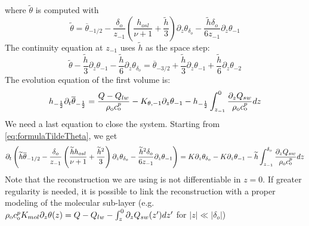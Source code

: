 where $\widetilde{\theta}$ is computed with
\begin{equation}
\label{eq:formulaTildeTheta}
\widetilde{\theta} = \overline{\theta}_{-1/2}
	-\frac{\delta_o}{z_{-1}}\left(
\frac{h_{osl}}{\nu+1} + \frac{\widetilde{h}}{3}
\right)\partial_z \theta_{\delta_o}
	- \frac{\widetilde{h}\delta_o}{6z_{-1}}
\partial_z \theta_{-1}
\end{equation}
The continuity equation at $z_{-1}$
uses $\widetilde{h}$
as the space step:
\begin{equation}
    \widetilde{\theta}
    - \frac{\widetilde{h}}{3}
    \partial_z \theta_{-1}
    - \frac{\widetilde{h}}{6}
    \partial_z \theta_{\delta_o}
    = \overline{\theta}_{-3/2}
    + \frac{\widetilde{h}}{3}
    \partial_z \theta_{-1}
    + \frac{\widetilde{h}}{6}
    \partial_z \theta_{-2}
\end{equation}
The evolution equation of the first volume is:
\begin{equation}
h_{-\frac{1}{2}}\partial_t
\overline{\theta}_{-\frac{1}{2}} =
	\frac{Q - Q_{lw}}{\rho_{\rm o} c_{\rm o}^p}
- K_{\theta, -1} \partial_z \theta_{-1}
- h_{-\frac{1}{2}}\int_{z_{-1}}^0
	\frac{\partial_z Q_{sw}}{\rho_{\rm o} c_{\rm o}^p} dz
\end{equation}
We need a last equation to close the system.
Starting from \eqref{eq:formulaTildeTheta}, we get
\begin{equation}
\partial_t
\left(
\widetilde{h}\overline{\theta}_{-1/2}
	-\frac{\delta_o}{z_{-1}}\left(
\frac{\widetilde{h}h_{osl}}{\nu+1} + \frac{\widetilde{h}^2}{3}
\right)\partial_z \theta_{\delta_o}
	- \frac{\widetilde{h}^2\delta_o}{6z_{-1}}
\partial_z \theta_{-1}
\right)
	= K\partial_z \theta_{\delta_o}-
K\partial_z \theta_{-1}
- \widetilde{h}
\int^{\delta_o}_{z_{-1}}
	\frac{\partial_z Q_{sw}}{\rho_{\rm o} c_{\rm o}^p} dz
\end{equation}
Note that the reconstruction we are using is not differentiable
in $z=0$.
If greater regularity is needed, it is possible to link
the reconstruction with a proper modeling of the molecular sub-layer
(e.g. $\rho_{\rm o} c_{\rm o}^p K_{mol} \partial_z \theta(z) =
Q - Q_{lw} - \int_z^0 \partial_z Q_{sw}(z')dz'$ for $|z|\ll|\delta_o|$)
